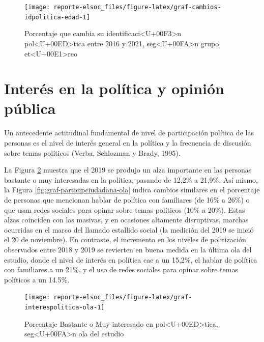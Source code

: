 \documentclass[
  12pt,
]{book}
\begin{document}
\begin{figure}

{\centering \texttt{[image: reporte-elsoc\_files/figure-latex/graf-cambios-idpolitica-edad-1]} 

}

\caption{Porcentaje que cambia su identificaci<U+00F3>n pol<U+00ED>tica entre 2016 y 2021, seg<U+00FA>n grupo et<U+00E1>reo}\label{fig:graf-cambios-idpolitica-edad}
\end{figure}

\hypertarget{interuxe9s-en-la-poluxedtica-y-opiniuxf3n-puxfablica}{%
\section{Interés en la política y opinión pública}\label{interuxe9s-en-la-poluxedtica-y-opiniuxf3n-puxfablica}}

Un antecedente actitudinal fundamental de nivel de participación política de las personas es el nivel de interés general en la política y la frecuencia de discusión sobre temas políticos (Verba, Schlozman y Brady, 1995).

La Figura \ref{fig:graf-interespolitica-ola} muestra que el 2019 se produjo un alza importante en las personas bastante o muy interesadas en la política, pasando de 12,2\% a 21,9\%. Así mismo, la Figura \ref{fig:graf-participciudadana-ola} indica cambios similares en el porcentaje de personas que mencionan hablar de política con familiares (de 16\% a 26\%) o que usan redes sociales para opinar sobre temas políticos (10\% a 20\%). Estas alzas coinciden con las masivas, y en ocasiones altamente disruptivas, marchas ocurridas en el marco del llamado estallido social (la medición del 2019 se inició el 20 de noviembre). En contraste, el incremento en los niveles de politización observados entre 2018 y 2019 se revierten en buena medida en la última ola del estudio, donde el nivel de interés en política cae a un 15,2\%, el hablar de política con familiares a un 21\%, y el uso de redes sociales para opinar sobre temas políticos a un 14.5\%.

\begin{figure}

{\centering \texttt{[image: reporte-elsoc\_files/figure-latex/graf-interespolitica-ola-1]} 

}

\caption{Porcentaje Bastante o Muy interesado en pol<U+00ED>tica, seg<U+00FA>n ola del estudio}\label{fig:graf-interespolitica-ola}
\end{figure}
\end{document}
